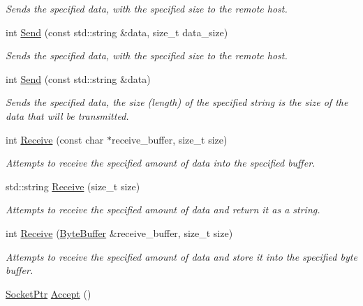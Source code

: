 \begin{DoxyCompactItemize}
\begin{DoxyCompactList}\small\item\em Sends the specified data, with the specified size to the remote host. \end{DoxyCompactList}\item 
int \hyperlink{class_senergy_1_1_socket_a9ca07e0de8c6f74f27963f17c8b1398d}{Send} (const std\-::string \&data, size\-\_\-t data\-\_\-size)
\begin{DoxyCompactList}\small\item\em Sends the specified data, with the specified size to the remote host. \end{DoxyCompactList}\item 
int \hyperlink{class_senergy_1_1_socket_a72e1de4e0e3ef63bb020c62bea989fa6}{Send} (const std\-::string \&data)
\begin{DoxyCompactList}\small\item\em Sends the specified data, the size (length) of the specified string is the size of the data that will be transmitted. \end{DoxyCompactList}\item 
int \hyperlink{class_senergy_1_1_socket_a7045f756d3c542ee1187a92ca13fa232}{Receive} (const char $\ast$receive\-\_\-buffer, size\-\_\-t size)
\begin{DoxyCompactList}\small\item\em Attempts to receive the specified amount of data into the specified buffer. \end{DoxyCompactList}\item 
std\-::string \hyperlink{class_senergy_1_1_socket_a0c1510be39bef49de15e8647b64dbb5e}{Receive} (size\-\_\-t size)
\begin{DoxyCompactList}\small\item\em Attempts to receive the specified amount of data and return it as a string. \end{DoxyCompactList}\item 
int \hyperlink{class_senergy_1_1_socket_aad6b0a1a9f7ac380b11b9ef814ada58b}{Receive} (\hyperlink{class_senergy_1_1_byte_buffer}{Byte\-Buffer} \&receive\-\_\-buffer, size\-\_\-t size)
\begin{DoxyCompactList}\small\item\em Attempts to receive the specified amount of data and store it into the specified byte buffer. \end{DoxyCompactList}\item 
\hyperlink{class_senergy_1_1_socket_ac9ff20ce80df2d0c2900cd0940ffe860}{Socket\-Ptr} \hyperlink{class_senergy_1_1_socket_abefda24a1a73b49e108a54342be0457e}{Accept} ()

\end{DoxyCompactItemize}
